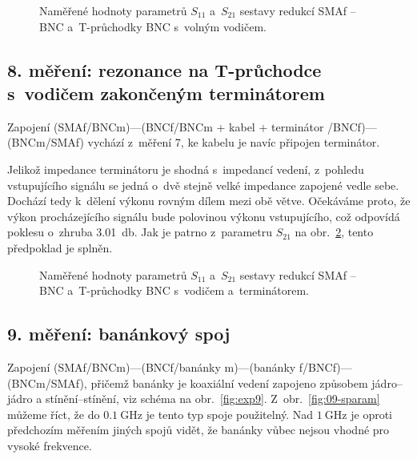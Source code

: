 \documentclass{protokol}
\newcommand\sparam{S}
\newcommand\female{f}
\newcommand\connector[2]{#1 -- #2}
\begin{document}
\begin{figure}[htp]
	\centering
	
	
	\caption{Naměřené hodnoty parametrů $\sparam_{11}$ a~$\sparam_{21}$
		sestavy redukcí \connector{SMA\female}{BNC}
		a~T-průchodky BNC s~volným vodičem.}
	\label{fig:07-sparam}
\end{figure}

\subsection{8. měření: rezonance na T-průchodce s~vodičem zakončeným terminátorem}
Zapojení (SMAf/BNCm)---(BNCf/BNCm + kabel + terminátor /BNCf)---(BNCm/SMAf)
vychází z~měření 7, ke kabelu je navíc připojen terminátor.

Jelikož impedance terminátoru je shodná s~impedancí vedení,
z~pohledu vstupujícího signálu se jedná o~dvě stejně velké impedance
zapojené vedle sebe.
Dochází tedy k~dělení výkonu rovným dílem mezi obě větve.
Očekáváme proto, že výkon procházejícího signálu bude polovinou výkonu
vstupujícího, což odpovídá poklesu o~zhruba \SI{3.01}{\decibel}.
Jak je patrno z~parametru $\sparam_{21}$ na obr.~\ref{fig:08-sparam},
tento předpoklad je splněn.

\begin{figure}[htp]
	\centering
	
	
	\caption{Naměřené hodnoty parametrů $\sparam_{11}$ a~$\sparam_{21}$
		sestavy redukcí \connector{SMA\female}{BNC}
		a~T-průchodky BNC s~vodičem a~terminátorem.}
	\label{fig:08-sparam}
\end{figure}

\subsection{9. měření: banánkový spoj}
Zapojení (SMAf/BNCm)---(BNCf/banánky m)---(banánky f/BNCf)---(BNCm/SMAf),
přičemž ba\-nán\-ky je koaxiální vedení zapojeno způsobem jádro--jádro a 
stínění--stínění, viz schéma na obr.~\ref{fig:exp9}. Z~obr.~\ref{fig:09-sparam} 
můžeme říct, že do $\SI{0.1}{\giga\hertz}$ je tento typ spoje použitelný. Nad 
$\SI{1}{\giga\hertz}$ je oproti předchozím měřením jiných spojů vidět, že 
banánky vůbec nejsou vhodné pro vysoké frekvence.
\end{document}

